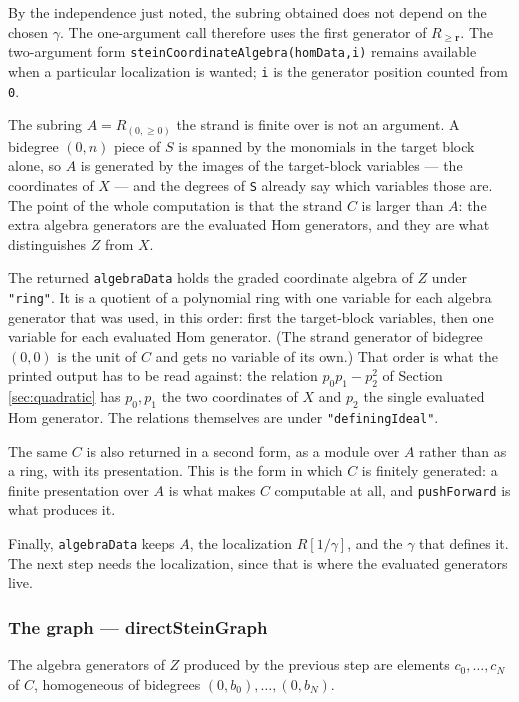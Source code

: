 \documentclass[11pt,reqno]{amsart}
\newcommand{\sO}{\ensuremath{\mathcal{O}}}
\theoremstyle{plain}
\theoremstyle{definition}
\begin{document}
By the independence just noted, the subring obtained does not depend on the
chosen \(\gamma\).  The one-argument call therefore uses the first generator
of \(R_{\geq\mathbf r}\).  The two-argument form
\texttt{steinCoordinateAlgebra(homData,i)} remains available when a particular
localization is wanted; \texttt{i} is the generator position counted from
\texttt{0}.

The subring \(A=R_{(0,\geq0)}\) the strand is finite over is not an
argument. A bidegree \((0,n)\) piece of \(S\) is spanned by the monomials
in the target block alone, so \(A\) is generated by the images of the
target-block variables --- the coordinates of \(X\) --- and the degrees of
\texttt{S} already say which variables those are. The point of the whole
computation is that the strand \(C\) is larger than \(A\): the extra
algebra generators are the evaluated Hom generators, and they are what
distinguishes \(Z\) from \(X\).

The returned \texttt{algebraData} holds the graded coordinate algebra of
\(Z\) under \texttt{"ring"}. It is a quotient of a polynomial ring with
one variable for each algebra generator that was used, in this order:
first the target-block variables, then one variable for each evaluated Hom
generator. (The strand generator of bidegree \((0,0)\) is the unit of
\(C\) and gets no variable of its own.) That order is what the printed
output has to be read against: the relation \(p_0p_1-p_2^2\) of Section
\ref{sec:quadratic} has \(p_0,p_1\) the two coordinates of \(X\) and
\(p_2\) the single evaluated Hom generator. The relations themselves are
under \texttt{"definingIdeal"}.

The same \(C\) is also returned in a second form, as a module over \(A\)
rather than as a ring, with its presentation. This is the form in which
\(C\) is finitely generated: a finite presentation over \(A\) is what
makes \(C\) computable at all, and \texttt{pushForward} is what produces
it.

Finally, \texttt{algebraData} keeps \(A\), the localization
\(R[1/\gamma]\), and the \(\gamma\) that defines it. The next step needs
the localization, since that is where the evaluated generators live.

\subsubsection*{The graph ---
  \texorpdfstring{{\normalfont\ttfamily directSteinGraph}}{directSteinGraph}}

The algebra generators of \(Z\) produced by the previous step are
elements \(c_0,\dots,c_N\) of \(C\), homogeneous of bidegrees
\((0,b_0),\dots,(0,b_N)\). 
\end{document}
